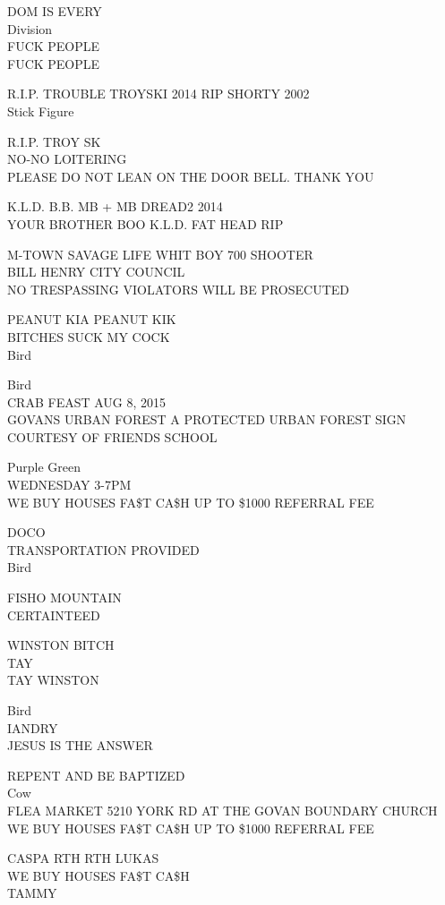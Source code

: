 \documentclass[10pt,letterpaper]{article}
\begin{document}
DOM IS EVERY\\
Division\\
FUCK PEOPLE\\
FUCK PEOPLE

R.I.P. TROUBLE TROYSKI 2014 RIP SHORTY 2002\\
Stick Figure

R.I.P. TROY SK\\
NO{-}NO LOITERING\\
PLEASE DO NOT LEAN ON THE DOOR BELL.  THANK YOU

K.L.D. B.B. MB + MB DREAD2 2014\\
YOUR BROTHER BOO K.L.D. FAT HEAD RIP

M{-}TOWN SAVAGE LIFE WHIT BOY 700 SHOOTER\\
BILL HENRY CITY COUNCIL\\
NO TRESPASSING VIOLATORS WILL BE PROSECUTED

PEANUT KIA PEANUT KIK\\
BITCHES SUCK MY COCK\\
Bird

Bird\\
CRAB FEAST AUG 8, 2015\\
GOVANS URBAN FOREST A PROTECTED URBAN FOREST SIGN COURTESY OF FRIENDS SCHOOL

Purple Green\\
WEDNESDAY 3{-}7PM\\
WE BUY HOUSES FA\$T CA\$H UP TO \$1000 REFERRAL FEE

DOCO\\
TRANSPORTATION PROVIDED\\
Bird

FISHO MOUNTAIN\\
CERTAINTEED

WINSTON BITCH\\
TAY\\
TAY WINSTON

Bird\\
IANDRY\\
JESUS IS THE ANSWER

REPENT AND BE BAPTIZED\\
Cow\\
FLEA MARKET 5210 YORK RD AT THE GOVAN BOUNDARY CHURCH\\
WE BUY HOUSES FA\$T CA\$H UP TO \$1000 REFERRAL FEE

CASPA RTH RTH LUKAS\\
WE BUY HOUSES FA\$T CA\$H\\
TAMMY
\end{document}
